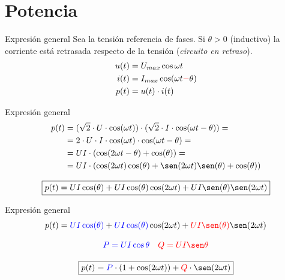 \documentclass[aspectratio=169, usenames,svgnames,dvipsnames]{beamer}
\begin{document}
\section{Potencia}
\label{sec:orgb56d3ec}
\begin{frame}[label={sec:org1f2b43a}]{Expresión general}
Sea la tensión referencia de fases. Si \(\theta > 0\) (inductivo) la corriente está retrasada respecto de la tensión (\emph{circuito en retraso}).
\begin{align*}
  u(t) &= U_{max} \cos \omega t\\
  i(t) &= I_{max} \cos (\omega t {\color{red}-} \theta)\\
  p(t) &= u(t) \cdot i(t)
\end{align*}
\end{frame}
\begin{frame}[label={sec:orgdfe2691}]{Expresión general}
\begin{align*}
  p(t) &= (\sqrt{2} \cdot U \cdot \cos(\omega t)) \cdot (\sqrt{2} \cdot I \cdot \cos(\omega t - \theta)) =\\
       &= 2 \cdot U \cdot I \cdot \cos(\omega t)\cdot \cos(\omega t - \theta) =\\
       &= U I \cdot \left( \cos(2\omega t - \theta) + \cos(\theta)\right) =\\
       &= U I \cdot \left(\cos(2\omega t)\cos(\theta) + \sen(2\omega t)\sen(\theta) +  \cos(\theta)\right)
\end{align*}

\begin{equation*}
  \boxed{p(t) = U I \cos(\theta) + U I \cos(\theta) \cos(2\omega t) + U I \sen(\theta) \sen(2\omega t)}
\end{equation*}
\end{frame}
\begin{frame}[label={sec:org2db6fcc}]{Expresión general}
\begin{equation*}
  p(t) = {\color{blue}U I \cos(\theta)} + {\color{blue}U I \cos(\theta)} \cos(2\omega t) + {\color{red}U I \sen(\theta)} \sen(2\omega t)
\end{equation*}

\[
  \color{blue}P = UI\cos\theta \quad%
  \color{red}Q = UI\sen\theta
\]

\begin{equation*}
  \boxed{p(t) = {\color{blue}P} \cdot (1 + \cos(2\omega t)) + {\color{red}Q} \cdot \sen(2\omega t)}
\end{equation*}
\end{frame}
\end{document}
